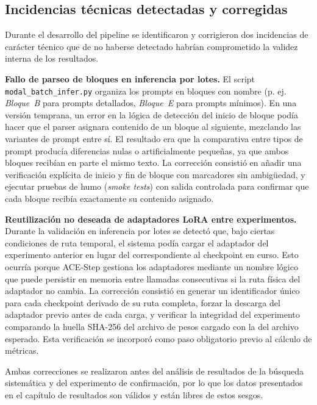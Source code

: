\documentclass[%
    school=etsisi,%
    type=pfg,%
    degree=61CD,%
]{upm-report}
\begin{document}
\subsection{Incidencias t\'ecnicas detectadas y corregidas}

Durante el desarrollo del pipeline se identificaron y corrigieron dos incidencias de car\'acter t\'ecnico que de no haberse detectado habr\'ian comprometido la validez interna de los resultados.

\textbf{Fallo de parseo de bloques en inferencia por lotes.} El script \texttt{modal\_batch\_infer.py} organiza los prompts en bloques con nombre (p. ej. \emph{Bloque~B} para prompts detallados, \emph{Bloque~E} para prompts m\'inimos). En una versi\'on temprana, un error en la l\'ogica de detecci\'on del inicio de bloque pod\'ia hacer que el parser asignara contenido de un bloque al siguiente, mezclando las variantes de prompt entre s\'i. El resultado era que la comparativa entre tipos de prompt produc\'ia diferencias nulas o artificialmente peque\~nas, ya que ambos bloques recib\'ian en parte el mismo texto. La correcci\'on consisti\'o en a\~nadir una verificaci\'on expl\'icita de inicio y fin de bloque con marcadores sin ambig\"uedad, y ejecutar pruebas de humo (\textit{smoke tests}) con salida controlada para confirmar que cada bloque recib\'ia exactamente su contenido asignado.

\textbf{Reutilizaci\'on no deseada de adaptadores LoRA entre experimentos.} Durante la validaci\'on en inferencia por lotes se detect\'o que, bajo ciertas condiciones de ruta temporal, el sistema pod\'ia cargar el adaptador del experimento anterior en lugar del correspondiente al checkpoint en curso. Esto ocurr\'ia porque ACE-Step gestiona los adaptadores mediante un nombre l\'ogico que puede persistir en memoria entre llamadas consecutivas si la ruta f\'isica del adaptador no cambia. La correcci\'on consisti\'o en generar un identificador \'unico para cada checkpoint derivado de su ruta completa, forzar la descarga del adaptador previo antes de cada carga, y verificar la integridad del experimento comparando la huella SHA-256 del archivo de pesos cargado con la del archivo esperado. Esta verificaci\'on se incorpor\'o como paso obligatorio previo al c\'alculo de m\'etricas.

Ambas correcciones se realizaron antes del an\'alisis de resultados de la b\'usqueda sistem\'atica y del experimento de confirmaci\'on, por lo que los datos presentados en el cap\'itulo de resultados son v\'alidos y est\'an libres de estos sesgos.
\end{document}
